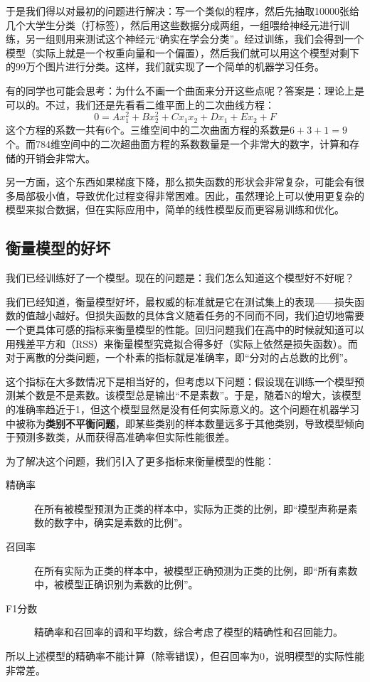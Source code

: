 于是我们得以对最初的问题进行解决：写一个类似的程序，然后先抽取10000张给几个大学生分类（打标签），然后用这些数据分成两组，一组喂给神经元进行训练，另一组则用来测试这个神经元“确实在学会分类”。经过训练，我们会得到一个模型（实际上就是一个权重向量和一个偏置），然后我们就可以用这个模型对剩下的99万个图片进行分类。这样，我们就实现了一个简单的机器学习任务。

\begin{tip}
有的同学也可能会思考：为什么不画一个曲面来分开这些点呢？答案是：理论上是可以的。不过，我们还是先看看二维平面上的二次曲线方程：
\[ 0 = Ax_1^2 + Bx_2^2 + Cx_1 x_2 + D x_1 + E x_2 + F \]
这个方程的系数一共有6个。三维空间中的二次曲面方程的系数是$6+3+1=9$个。而784维空间中的二次超曲面方程的系数数量是一个非常大的数字，计算和存储的开销会非常大。

另一方面，这个东西如果梯度下降，那么损失函数的形状会非常复杂，可能会有很多局部极小值，导致优化过程变得非常困难。因此，虽然理论上可以使用更复杂的模型来拟合数据，但在实际应用中，简单的线性模型反而更容易训练和优化。
\end{tip}

\subsection{衡量模型的好坏}

我们已经训练好了一个模型。现在的问题是：我们怎么知道这个模型好不好呢？

我们已经知道，衡量模型好坏，最权威的标准就是它在测试集上的表现——损失函数的值越小越好。但损失函数的具体含义随着任务的不同而不同，我们迫切地需要一个更具体可感的指标来衡量模型的性能。回归问题我们在高中的时候就知道可以用残差平方和（RSS）来衡量模型究竟拟合得多好（实际上依然是损失函数）。而对于离散的分类问题，一个朴素的指标就是准确率，即“分对的占总数的比例”。

这个指标在大多数情况下是相当好的，但考虑以下问题：假设现在训练一个模型预测某个数是不是素数。该模型总是输出“不是素数”。于是，随着N的增大，该模型的准确率趋近于1，但这个模型显然是没有任何实际意义的。这个问题在机器学习中被称为\textbf{类别不平衡问题}，即某些类别的样本数量远多于其他类别，导致模型倾向于预测多数类，从而获得高准确率但实际性能很差。

为了解决这个问题，我们引入了更多指标来衡量模型的性能：
\begin{description}
    \item[精确率] 在所有被模型预测为正类的样本中，实际为正类的比例，即“模型声称是素数的数字中，确实是素数的比例”。
    \item[召回率] 在所有实际为正类的样本中，被模型正确预测为正类的比例，即“所有素数中，被模型正确识别为素数的比例”。
    \item[F1分数] 精确率和召回率的调和平均数，综合考虑了模型的精确性和召回能力。 
\end{description}
所以上述模型的精确率不能计算（除零错误），但召回率为0，说明模型的实际性能非常差。

